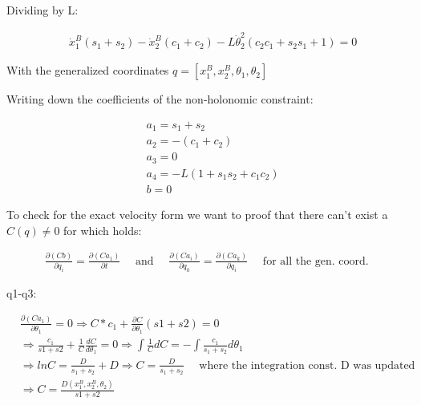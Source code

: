 Dividing by L:

\begin{equation}
    \begin{split}           
        &\dot x_1^B\left(s_1+s_2\right)-\dot x_2^B\left(c_1+c_2\right)-
        L\dot\theta_2^2\left(c_2c_1+s_2s_1 + 1\right) = 0
    \end{split}
\end{equation}

With the generalized coordinates $q = [x_1^B,x_2^B,\theta_1,\theta_2]$

Writing down the coefficients of the non-holonomic constraint:

\begin{equation}
    \begin{split}
        &a_1 = s_1 + s_2\\
        &a_2 = -\left(c_1 + c_2\right)\\
        &a_3 = 0\\
        &a_4 = -L\left(1 + s_1s_2 + c_1c_2\right)\\
        &b = 0
    \end{split}
\end{equation}

To check for the exact velocity form we want to proof that there can't exist a $C(q) \neq 0$ for which holds:

\begin{equation}
    \begin{split}
        \frac{\partial(Cb)}{\partial q_i} = \frac{\partial(Ca_1)}{\partial t}\quad \text{ and } \quad \frac{\partial(Ca_i)}{\partial q_k} = \frac{\partial(Ca_k)}{\partial q_i} \quad \text{ for all the gen. coord. }
    \end{split}
\end{equation}

q1-q3:

\begin{equation}
    \begin{split}
        &\frac{\partial(Ca_1)}{\partial \theta_1} = 0 \Rightarrow C*c_1 + \frac{\partial C}{\partial \theta_1}(s1 + s2) = 0\\
        &\Rightarrow \frac{c_1}{s1+s2} + \frac{1}{C}\frac{d C}{d \theta_1} = 0 \Rightarrow \int \frac{1}{C}dC = - \int \frac{c_1}{s_1+s_2}d\theta_1\\
        &\Rightarrow lnC = \frac{D}{s_1+s_2} + D \Rightarrow C = \frac{D}{s_1+s_2} \quad \text{ where the integration const. D was updated}\\
        &\Rightarrow C = \frac{D(x_1^B,x_2^B,\theta_2)}{s1 + s2}
    \end{split}
\end{equation}

